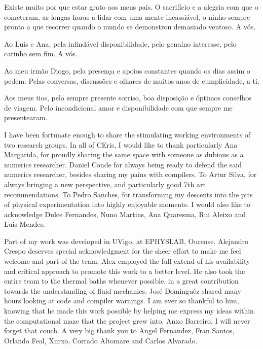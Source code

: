 
\begin{acknowledgments} 

Existe muito por que estar grato aos meus pais. O sacrif\'{i}cio e a alegria com que o cometeram, as longas horas a lidar com uma mente incassi\'{a}vel, o ninho sempre pronto a que recorrer quando o mundo se demonstrou demasiado ventoso. A v\'{o}s. 

Ao Lu\'{i}s e Ana, pela infind\'{a}vel disponibilidade, pelo genu\'{i}no interesse, pelo carinho sem fim. A v\'{o}s.

Ao meu irm\~{a}o Diogo, pela presen\c{c}a e apoios constantes quando os dias assim o pedem. Pelas conversas, discuss\~{o}es e olhares de muitos anos de cumplicidade, a ti.

Aos meus tios, pelo sempre presente sorriso, boa disposi\c{c}\~{a}o e \'{o}ptimos conselhos de viagem. Pelo incondicional amor e disponibilidade com que sempre me presentearam.

I have been fortunate enough to share the stimulating working environments of two research groups. In all of CEris, I would like to thank particularly Ana Margarida, for proudly sharing the same space with someone as dubious as a numerics researcher. Daniel Conde for always being ready to defend the said numerics researcher, besides sharing my pains with compilers. To Artur Silva, for always bringing a new perspective, and particularly good 7th art recommendations. To Pedro Sanches, for transforming my descents into the pits of physical experimentation into highly enjoyable moments. I would also like to acknowledge Dulce Fernandes, Nuno Martins, Ana Quaresma, Rui Aleixo and Luis Mendes.

Part of my work was developed in UVigo, at EPHYSLAB, Ourense. Alejandro Crespo deserves special acknowledgment for the sheer effort to make me feel welcome and part of the team. Alex employed the full extend of his availability and critical approach to promote this work to a better level. He also took the entire team to the thermal baths whenever possible, in a great contribution towards the understanding of fluid mechanics. Jos\'{e} Domingu\'{e}z shared many hours looking at code and compiler warnings. I am ever so thankful to him, knowing that he made this work possible by helping me express my ideas within the computational maze that the project grew into. Anxo Barreiro, I will never forget that couch. A very big thank you to Angel Fernandez, Fran Santos, Orlando Feal, Xurxo, Corrado Altomare and Carlos Alvarado.


\end{acknowledgments}
